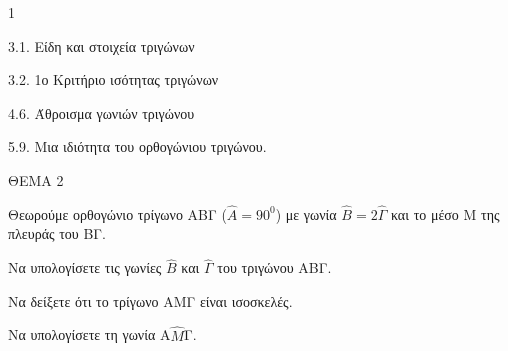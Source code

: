 \begin{ylh}{1}
    \item 3.1. Είδη και στοιχεία τριγώνων
    \item 3.2. 1ο Κριτήριο ισότητας τριγώνων
    \item 4.6. Άθροισμα γωνιών τριγώνου
    \item 5.9. Μια ιδιότητα του ορθογώνιου τριγώνου.
\end{ylh}

ΘΕΜΑ 2

Θεωρούμε ορθογώνιο τρίγωνο ΑΒΓ ($\widehat{Α} = 90^{0}$) με γωνία $\widehat{Β} = 2\widehat{\Gamma}$ και το μέσο Μ της πλευράς του ΒΓ.

\begin{alist}
\item Να υπολογίσετε τις γωνίες $\widehat{Β}$ και $\widehat{\Gamma}$ του τριγώνου ΑΒΓ. 

\item Να δείξετε ότι το τρίγωνο ΑΜΓ είναι ισοσκελές. 

\item Να υπολογίσετε τη γωνία Α$\widehat{Μ}$Γ. 
\end{alist}
